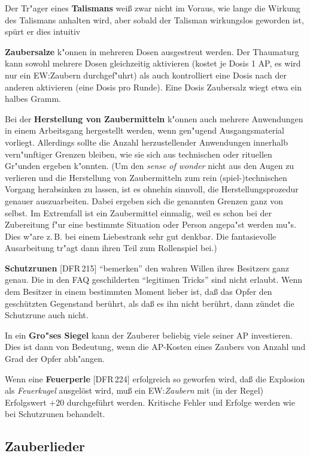 \documentclass[10pt,a4paper,germanpar]{article}
\begin{document}
Der Tr"ager eines \textbf{Talismans} weiß zwar nicht im Voraus, wie
lange die Wirkung des Talismans anhalten wird, aber sobald der
Talisman wirkungslos geworden ist, spürt er dies intuitiv

\textbf{Zaubersalze} k"onnen in mehreren Dosen ausgestreut werden. Der
Thaumaturg kann sowohl mehrere Dosen gleichzeitig aktivieren (kostet
je Dosis 1 AP, es wird nur ein EW:Zaubern durchgef"uhrt) als auch
kontrolliert eine Dosis nach der anderen aktivieren (eine Dosis pro
Runde). Eine Dosis Zaubersalz wiegt etwa ein halbes Gramm.

Bei der \textbf{Herstellung von Zaubermitteln} k"onnen auch mehrere
Anwendungen in einem Arbeitsgang hergestellt werden, wenn gen"ugend
Ausgangsmaterial vorliegt. Allerdings sollte die Anzahl
herzustellender Anwendungen innerhalb vern"unftiger Grenzen bleiben,
wie sie sich aus technischen oder rituellen Gr"unden ergeben k"onnten.
(Um den \emph{sense of wonder} nicht aus den Augen zu verlieren und
die Herstellung von Zaubermitteln zum rein (spiel-)technischen Vorgang
herabsinken zu lassen, ist es ohnehin sinnvoll, die
Herstellungsprozedur genauer auszuarbeiten. Dabei ergeben sich die
genannten Grenzen ganz von selbst. Im Extremfall ist ein Zaubermittel
einmalig, weil es schon bei der Zubereitung f"ur eine bestimmte
Situation oder Person angepa"st werden mu"s. Dies w"are z.\,B. bei einem
Liebestrank sehr gut denkbar. Die fantasievolle Ausarbeitung tr"agt
dann ihren Teil zum Rollenspiel bei.)

\textbf{Schutzrunen} [DFR\,215] "`bemerken"' den wahren Willen ihres
Besitzers ganz genau. Die in den FAQ geschilderten "`legitimen
Tricks"' sind nicht erlaubt. Wenn dem Besitzer in einem bestimmten
Moment lieber ist, daß das Opfer den geschützten Gegenstand berührt,
als daß es ihn nicht berührt, dann zündet die Schutzrune auch nicht.

In ein \textbf{Gro"ses Siegel} kann der Zauberer beliebig viele seiner
AP investieren. Dies ist dann von Bedeutung, wenn die AP-Kosten eines
Zaubers von Anzahl und Grad der Opfer abh"angen.

Wenn eine \textbf{Feuerperle} [DFR\,224] erfolgreich so geworfen wird,
daß die Explosion als \emph{Feuerkugel} ausgelöst wird, muß ein
EW:\emph{Zaubern} mit (in der Regel) Erfolgswert +20 durchgeführt
werden. Kritische Fehler und Erfolge werden wie bei Schutzrunen
behandelt.

\subsection{Zauberlieder}
\end{document}
